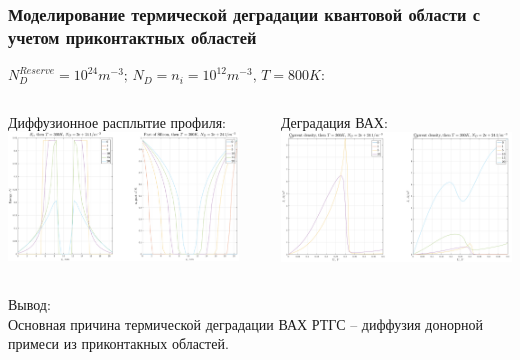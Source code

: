 \documentclass[10pt,pdf,hyperref={unicode},aspectratio={169}]{beamer}
\begin{document}
\begin{frame}
	\frametitle{Моделирование термической деградации квантовой области с учетом приконтактных областей}
	{\large\color{blue} $N_{D}^{Reserve} = 10^{24}m^{-3};\,N_{D} = n_{i} = 10^{12} m^{-3},\,T = 800K$:}\\
	\begin{columns}
		{\color{red} Диффузионное расплытие профиля:}\\
	   	\includegraphics[width=.99\linewidth,center]{assets/DAlGaAs_Si}\\
		\rule[0mm]{0.2ex}{40mm}
		{\color{red} Деградация ВАХ:}\\
	   	\includegraphics[width=.99\linewidth,center]{assets/JDAlGaAs_Si}\\
	\end{columns}
	{\large\color{blue}Вывод:}\\
	Основная причина термической деградации ВАХ РТГС -- диффузия донорной примеси из приконтакных областей.
\end{frame}
\end{document}
